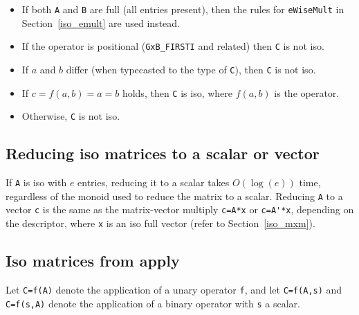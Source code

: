 \documentclass[12pt]{article}
\begin{document}
    \begin{itemize}
    \item If both \verb'A' and \verb'B' are full (all entries present), then
    the rules for \verb'eWiseMult' in Section~\ref{iso_emult} are used
    instead.

    \item If the operator is positional (\verb'GxB_FIRSTI' and related) then
    \verb'C' is not iso.

    \item If $a$ and $b$ differ (when typecasted to the type of \verb'C'),
    then \verb'C' is not iso.

    \item If $c=f(a,b) = a = b$ holds, then \verb'C' is iso,
    where $f(a,b)$ is the operator.

    \item Otherwise, \verb'C' is not iso.
    \end{itemize}

\subsection{Reducing iso matrices to a scalar or vector}
\label{iso_reduce}

If \verb'A' is iso with $e$ entries, reducing it to a scalar takes $O(\log(e))$
time, regardless of the monoid used to reduce the matrix to a scalar.  Reducing
\verb'A' to a vector \verb'c' is the same as the matrix-vector multiply
\verb"c=A*x" or \verb"c=A'*x", depending on the descriptor, where \verb'x'
is an iso full vector (refer to Section~\ref{iso_mxm}).

\subsection{Iso matrices from apply}
\label{iso_apply}

Let \verb'C=f(A)' denote the application of a unary operator \verb'f',
and let \verb'C=f(A,s)' and \verb'C=f(s,A)' denote the application of a binary
operator with \verb's' a scalar.
\end{document}
